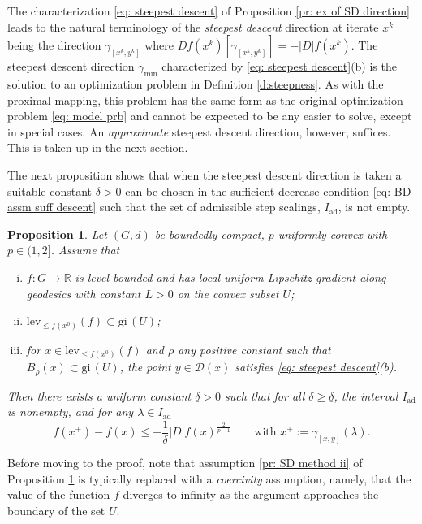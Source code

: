\documentclass{article}
\theoremstyle{plain}\newtheorem{theorem}{Theorem}[section]
\theoremstyle{plain}\newtheorem{definition}[theorem]{Definition}
\theoremstyle{plain}\newtheorem{lemma}[theorem]{Lemma}
\theoremstyle{definition}\newtheorem{remark}[theorem]{Remark}
\theoremstyle{definition}\newtheorem{example}[theorem]{Example}
\theoremstyle{plain}\newtheorem{proposition}[theorem]{Proposition}
\theoremstyle{plain}\newtheorem{inference}[theorem]{Inference}
\theoremstyle{plain}\newtheorem{corollary}[theorem]{Corollary}
\theoremstyle{plain}\newtheorem{assumption}[theorem]{Assumption}
\begin{document}
The characterization \eqref{eq: steepest descent} of Proposition \ref{pr: ex of SD direction} leads to the natural terminology of the {\em steepest descent} direction at iterate $x^k$ being the direction $\gamma_{[x^k,y^k]}$ where $Df(x^k)[\gamma_{[x^k,y^k]}]=-|D|f(x^k)$. The steepest descent direction $\gamma_{\min}$ characterized by \eqref{eq: steepest descent}(b) is the solution to an optimization problem in Definition \ref{d:steepness}. As with the proximal mapping, this problem has the same form as the original optimization problem \eqref{eq: model prb} and cannot be expected to be any easier to solve, except in special cases.  An {\em approximate} steepest descent direction, however, suffices. This is taken up in the next section. 

The next proposition shows that when the steepest descent direction is taken a suitable constant $\delta>0$ can be chosen in the sufficient decrease condition \eqref{eq: BD assm suff descent} such that the set of admissible step scalings, $I_{\mathrm{ad}}$, is not empty.
\begin{proposition}\label{pr: SD method}
    Let $(G,d)$ be boundedly compact, $p$-uniformly convex with $p\in(1,2]$. Assume that
    \begin{enumerate}[(i)]
        \item\label{pr: SD method i} $f:G\to\mathbb{R}$ is level-bounded and has local uniform Lipschitz gradient along geodesics with constant $L>0$ on the convex subset $U$;
        \item\label{pr: SD method ii} $\mathrm{lev}_{\leq f(x^0)}(f)\subset \mathrm{gi}\,(U)$;
        \item\label{pr: SD method iii} for $x\in\mathrm{lev}_{\leq f(x^0)}(f)$ and $\rho$ any positive constant such that $B_\rho(x)\subset \mathrm{gi}\,(U)$, the point $y\in\mathcal{D}(x)$ satisfies \eqref{eq: steepest descent}(b).
    \end{enumerate}
    Then there exists a uniform constant $\underline{\delta} >0$ such that for all $\delta\geq\underline{\delta} $, the interval $I_{\mathrm{ad}}$ is nonempty, and for any $\lambda\in I_{\mathrm{ad}}$
    $$
    f(x^+)-f(x)\leq-\frac{1}{\delta}|D|f(x)^{\frac{2}{p-1}} \qquad \text{with}\,\,x^+:=\gamma_{[x,y]}(\lambda).
    $$
\end{proposition}
Before moving to the proof, note that assumption \eqref{pr: SD method ii} of Proposition \ref{pr: SD method} is typically replaced with a {\em coercivity} assumption, namely, that the value of the function $f$ diverges to infinity as the argument approaches the boundary of the set $U$.
\end{document}
